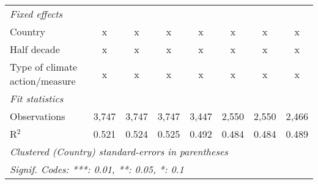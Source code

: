 \begin{table}[htbp]
\begin{tabular}{lccccccc}
      \emph{Fixed effects}\\
      Country                                                                                 & x              & x             & x             & x             & x            & x            & x\\  
      Half decade                                                                             & x              & x             & x             & x             & x            & x            & x\\  
      Type of climate action/measure                                                          & x              & x             & x             & x             & x            & x            & x\\  
      \midrule \emph{Fit statistics}\\
      Observations                                                                            & 3,747          & 3,747         & 3,747         & 3,447         & 2,550        & 2,550        & 2,466\\  
      R$^2$                                                                                   & 0.521          & 0.524         & 0.525         & 0.492         & 0.484        & 0.484        & 0.489\\  
      \midrule
      \multicolumn{8}{l}{\emph{Clustered (Country) standard-errors in parentheses}}\\
      \multicolumn{8}{l}{\emph{Signif. Codes: ***: 0.01, **: 0.05, *: 0.1}}\\
   \end{tabular}
\end{table}


